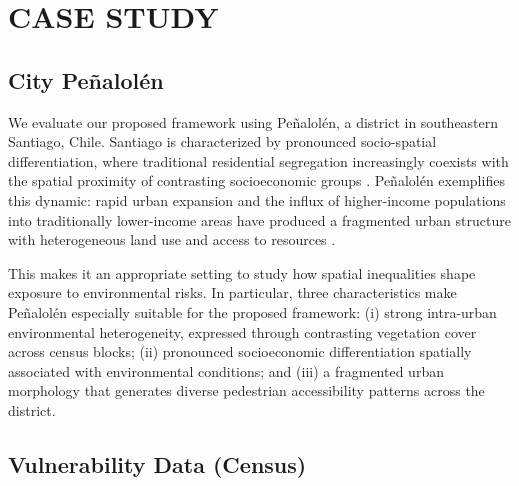 \documentclass{wscpaperproc}
\theoremstyle{wsc}
\begin{document}

\section{CASE STUDY}
\label{sec:data}

\subsection{City Peñalolén}

We evaluate our proposed framework using Peñalolén, a district in southeastern Santiago, Chile. Santiago is characterized by pronounced socio-spatial differentiation, where traditional residential segregation increasingly coexists with the spatial proximity of contrasting socioeconomic groups \cite{mendez2018inequalities,borsdorf2016gated}. Peñalolén exemplifies this dynamic: rapid urban expansion and the influx of higher-income populations into traditionally lower-income areas have produced a fragmented urban structure with heterogeneous land use and access to resources \cite{villar2021penalolen}.

This makes it an appropriate setting to study how spatial inequalities shape exposure to environmental risks. In particular, three characteristics make Peñalolén especially suitable for the proposed framework: (i) strong intra-urban environmental heterogeneity, expressed through contrasting vegetation cover across census blocks; (ii) pronounced socioeconomic differentiation spatially associated with environmental conditions; and (iii) a fragmented urban morphology that generates diverse pedestrian accessibility patterns across the district.

\subsection{Vulnerability Data (Census)}
\end{document}
